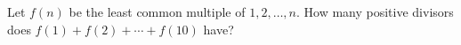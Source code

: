 Let $f(n)$ be the least common multiple of $1,2,\dots,n$. How many positive divisors does $f(1)+f(2)+\cdots+f(10)$ have?
